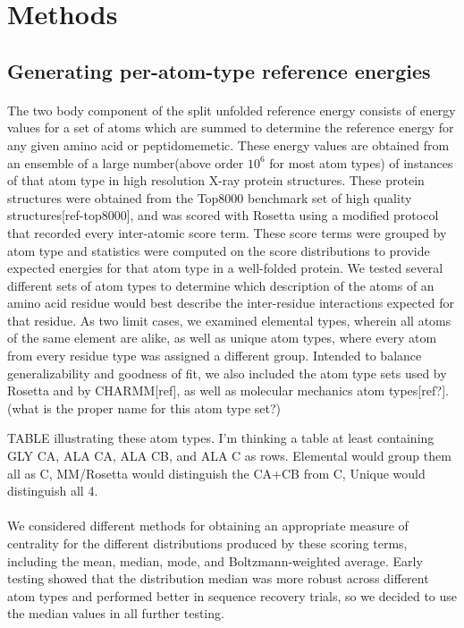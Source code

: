 \section{Methods}

\subsection{Generating per-atom-type reference energies}
\paragraph{}
The two body component of the split unfolded reference energy consists of energy values for a set of atoms which are summed to determine the reference energy for any given amino acid or peptidomemetic. These energy values are obtained from an ensemble of a large number(above order $10^6$ for most atom types) of instances of that atom type in high resolution X-ray protein structures. These protein structures were obtained from the Top8000 benchmark set of high quality structures[ref-top8000], and was scored with Rosetta using a modified protocol that recorded every inter-atomic score term. These score terms were grouped by atom type and statistics were computed on the score distributions to provide expected energies for that atom type in a well-folded protein. We tested several different sets of atom types to determine which description of the atoms of an amino acid residue would best describe the inter-residue interactions expected for that residue. As two limit cases, we examined elemental types, wherein all atoms of the same element are alike, as well as unique atom types, where every atom from every residue type was assigned a different group. Intended to balance generalizability and goodness of fit, we also included the atom type sets used by Rosetta and by CHARMM[ref], as well as molecular mechanics atom types[ref?]. (what is the proper name for this atom type set?)

TABLE illustrating these atom types. I'm thinking a table at least containing GLY CA, ALA CA, ALA CB, and ALA C as rows. Elemental would group them all as C, MM/Rosetta would distinguish the CA+CB from C, Unique would distinguish all 4.

\paragraph{}
We considered different methods for obtaining an appropriate measure of centrality for the different distributions produced by these scoring terms, including the mean, median, mode, and Boltzmann-weighted average. Early testing showed that the distribution median was more robust across different atom types and performed better in sequence recovery trials, so we decided to use the median values in all further testing.


